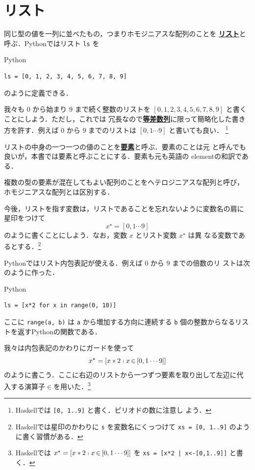\documentclass[a5paper,twoside,fleqn]{jsbook}
\newcommand{\programminglanguage}[1]{\textsf{#1}}
\newcommand{\haskell}{\programminglanguage{Haskell}}
\newcommand{\python}{\programminglanguage{Python}}
\newcommand{\keyword}[1]{{\underline{\textbf{#1}}}}
\newcommand{\code}[1]{\texttt{#1}}
\newenvironment{pythoncode}{\begin{itembox}[r]{\python}}{\end{itembox}}
\DeclareMathOperator{\mFrom}{\in}
\newcommand{\mListWith}[1]{\left[#1\right]}
\newcommand{\mList}[1]{{#1}^\mathrm{\star}}
\newcommand{\mListComp}[1]{\shortmid#1}
\begin{document}
\section{リスト}

同じ型の値を一列に並べたもの，つまりホモジニアスな配列のことを
\keyword{リスト}と呼ぶ．\python ではリスト \code{ls} を
\begin{pythoncode}
\begin{verbatim}
ls = [0, 1, 2, 3, 4, 5, 6, 7, 8, 9]
\end{verbatim}
\end{pythoncode}
のように定義できる．

我々も $0$ から始まり $9$ まで続く整数のリストを
$\mListWith{0,1,2,3,4,5,6,7,8,9}$ と書くことにしよう．ただし，これでは
冗長なので\keyword{等差数列}に限って簡略化した書き方を許す．例えば $0$
から $9$ までのリストは $\mListWith{0,1\dotsb9}$ と書いても良い．
\footnote{\haskell では \code{[0, 1..9]} と書く．ピリオドの数に注意し
  よう．}

リストの中身の一つ一つの値のことを\keyword{要素}と呼ぶ．要素のことは元
と呼んでも良いが，本書では要素と呼ぶことにする．要素も元も英語の
elementの和訳である．

複数の型の要素が混在してもよい配列のことをヘテロジニアスな配列と呼び，
ホモジニアスな配列とは区別する．

今後，リストを指す変数は，リストであることを忘れないように変数名の肩に
星印をつけて
\begin{equation}
\mList{x}=\mListWith{0,1\dotsb9}
\end{equation}
のように書くことにしよう．なお，変数 $x$ とリスト変数 $\mList{x}$ は異
なる変数であるとする．\footnote{\haskell では星印のかわりに \code{s}
  を変数名にくっつけて \code{xs = [0, 1..9]} のように書く習慣がある．}

\python ではリスト内包表記が使える．例えば $0$ から $9$ までの倍数のリ
ストは次のように作った．
\begin{pythoncode}
\begin{verbatim}
ls = [x*2 for x in range(0, 10)]
\end{verbatim}
\end{pythoncode}
ここに \code{range(a, b)} は \code{a} から増加する方向に連続する
\code{b} 個の整数からなるリストを返す\python の関数である．

我々は内包表記のかわりにガードを使って
\begin{equation}
\mList{x}=\mListWith{x*2\mListComp{x\mFrom{\mListWith{0,1\dotsb9}}}}
\end{equation}
のように書こう．ここに右辺のリストから一つずつ要素を取り出して左辺に代
入する演算子$\mFrom$を用いた．\footnote{\haskell では
  $\mList{x}=\mListWith{x*2\mListComp{x\mFrom{\mListWith{0,1\dotsb9}}}}$
  を \code{xs = [x*2 | x<-[0,1..9]]} と書く．}
\end{document}
